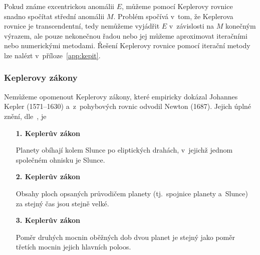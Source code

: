 \documentclass[A4paper, 12pt, oneside]{book}
\begin{document}
Pokud známe excentrickou anomálii $E$, můžeme pomocí Keplerovy rovnice snadno spočítat střední anomálii $M$. Problém spočívá v~tom, že Keplerova rovnice je transcendentní, tedy nemůžeme vyjádřit $E$ v~závislosti na $M$ konečným výrazem, ale pouze nekonečnou řadou nebo jej můžeme aproximovat iteračními nebo numerickými metodami. Řešení Keplerovy rovnice pomocí iterační metody lze nalézt v~příloze~\ref{app:kepit}.

\subsubsection{Keplerovy zákony} \label{sec:kepzak}

Nemůžeme opomenout Keplerovy zákony, které empiricky dokázal Johannes Kepler (1571--1630) a~z~pohybových rovnic odvodil Newton (1687). Jejich úplné znění, dle~\cite{wiki:kepzak}, je 
\begin{enumerate}[wide]
	\item[\textbf{1. Keplerův zákon}] \ 

Planety obíhají kolem Slunce po eliptických drahách, v~jejichž jednom společném ohnisku je Slunce.
	\item[\textbf{2. Keplerův zákon}] \ 

Obsahy ploch opsaných průvodičem planety (tj.\ spojnice planety a~Slunce) za stejný čas jsou stejně velké.
	\item[\textbf{3. Keplerův zákon}] \ 

Poměr druhých mocnin oběžných dob dvou planet je stejný jako poměr třetích mocnin jejich hlavních poloos.
\end{enumerate}
\end{document}
